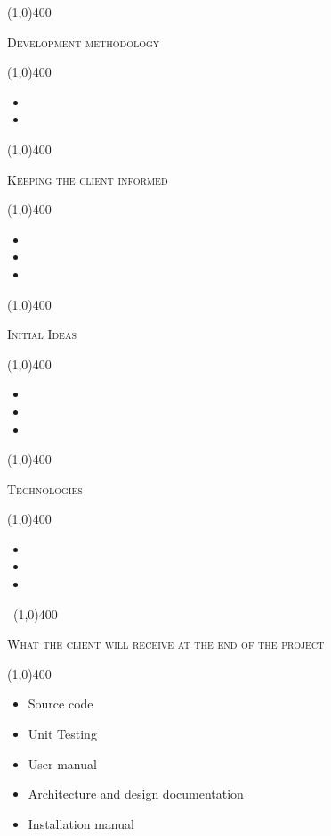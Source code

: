 \documentclass[12pt,a4paper]{report}
\begin{document}
	\begin{center}
	
	\line(1,0){400}\\
	{\scshape\large Development methodology \par}
	\line(1,0){400}\\
	\end{center}
		\begin{itemize}
\item 
\item 
\end{itemize}

\begin{center}
	
	\line(1,0){400}\\
	{\scshape\large Keeping the client informed \par}
	\line(1,0){400}\\
	\end{center}
		\begin{itemize}
\item 
\item 
\item
\end{itemize}

\begin{center}
	
	\line(1,0){400}\\
	{\scshape\large Initial Ideas \par}
	\line(1,0){400}\\
	\end{center}
		\begin{itemize}
\item 
\item 
\item
\end{itemize}
\begin{center}
	
	\line(1,0){400}\\
	{\scshape\large Technologies \par}
	\line(1,0){400}\\
	\end{center}
		\begin{itemize}
\item 
\item 
\item
\end{itemize}
\newpage

\begin{center}
	
	\vspace*{-3cm}\
	\line(1,0){400}\\
	{\scshape\large What the client will receive at the end of the project\par}
	\line(1,0){400}\\
	\end{center}
		\begin{itemize}
\item Source code 
\item Unit Testing
\item User manual
\item Architecture and design documentation
\item Installation manual
\end{itemize}
\end{document}
